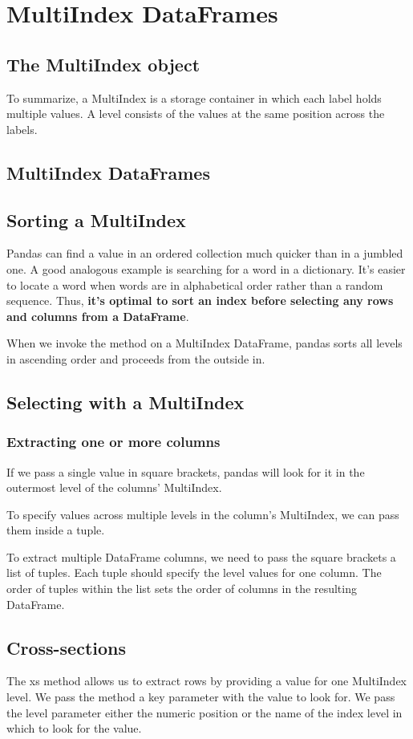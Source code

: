 \chapter{MultiIndex DataFrames\label{Ch07}}
\section{The MultiIndex object}
To summarize, a MultiIndex is a storage container in which each label holds multiple values. A level consists of the values at the same position across the labels.

\section{MultiIndex DataFrames}

\section{Sorting a MultiIndex}
Pandas can find a value in an ordered collection much quicker than in a jumbled one. A good analogous example is searching for a word in a dictionary. It's easier to locate a word when words are in alphabetical order rather than a random sequence. Thus, \textbf{it's optimal to sort an index before selecting any rows and columns from a DataFrame}.

When we invoke the method on a MultiIndex DataFrame, pandas sorts all levels in ascending order and proceeds from the outside in.
\section{Selecting with a MultiIndex}
\subsection{Extracting one or more columns}
If we pass a single value in square brackets, pandas will look for it in the outermost level of the columns' MultiIndex.

To specify values across multiple levels in the column's MultiIndex, we can pass them inside a tuple.

To extract multiple DataFrame columns, we need to pass the square brackets a list of tuples. Each tuple should specify the level values for one column. The order of tuples within the list sets the order of columns in the resulting DataFrame.
\section{Cross-sections}
The xs method allows us to extract rows by providing a value for one MultiIndex level. We pass the method a key parameter with the value to look for. We pass the level parameter either the numeric position or the name of the index level in which to look for the value.

